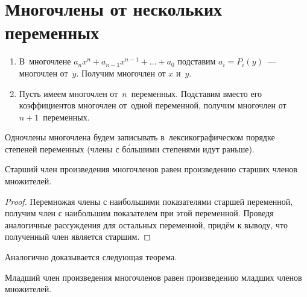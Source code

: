 \section{Многочлены от нескольких переменных}
\begin{enumerate}
	\item В~многочлене $a_n x^n + a_{n-1} x^{n-1} + \ldots + a_0$ подставим $a_i = P_i(y)$~--- многочлен от~$y$.
	Получим многочлен от $x$ и~$y$.
	
	\item Пусть имеем многочлен от~$n$~переменных.
	Подставим вместо его коэффициентов многочлен от~одной переменной, получим многочлен от~$n + 1$~переменных.
\end{enumerate}

Одночлены многочлена будем записывать в~лексикографическом порядке степеней переменных (члены с б\'{о}льшими степенями идут раньше).

\begin{theorem}
Старший член произведения многочленов равен произведению старших членов множителей.
\end{theorem}
\begin{proof}
Перемножая члены с наибольшими показателями старшей переменной, получим член с наибольшим показателем при этой переменной.
Проведя аналогичные рассуждения для остальных переменной, придём к выводу, что полученный член является старшим.
\end{proof}

Аналогично доказывается следующая теорема.
\begin{theorem}
Младший член произведения многочленов равен произведению младших членов множителей.
\end{theorem}